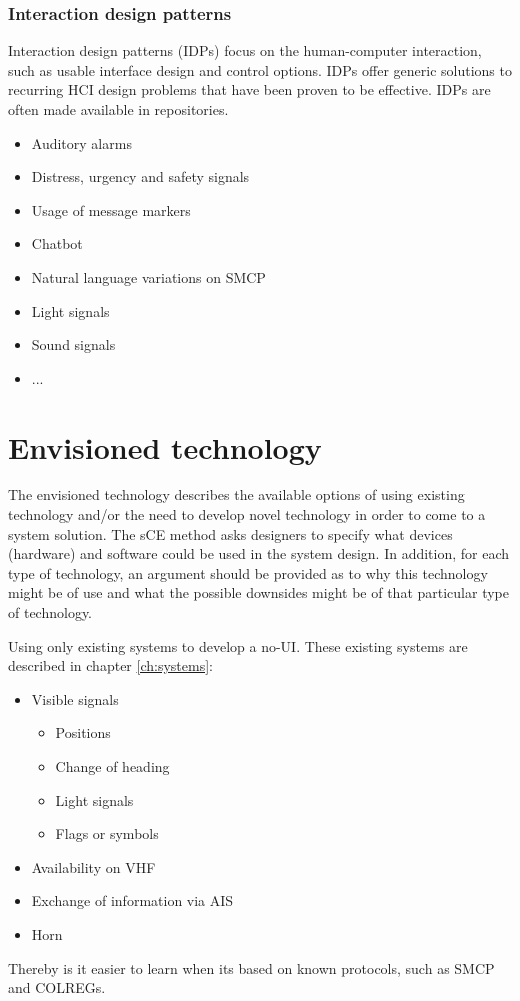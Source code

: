 \subsubsection{Interaction design patterns}
Interaction design patterns (IDPs) focus on the human-computer interaction, such as usable interface design and control options. IDPs offer generic solutions to recurring HCI design problems that have been proven to be effective. IDPs are often made available in repositories.

\begin{itemize}
	\item Auditory alarms
	\item Distress, urgency and safety signals
	\item Usage of message markers
	\item Chatbot
	\item Natural language variations on \ac{SMCP}
	\item Light signals
	\item Sound signals
	\item ...
\end{itemize}

\section{Envisioned technology}
The envisioned technology describes the available options of using existing technology and/or the need to develop novel technology in order to come to a system solution. The sCE method asks designers to specify what devices (hardware) and software could be used in the system design. In addition, for each type of technology, an argument should be provided as to why this technology might be of use and what the possible downsides might be of that particular type of technology.

Using only existing systems to develop a \acf{no-UI}. These existing systems are described in chapter \ref{ch:systems}:

\begin{itemize}
	\item Visible signals
	\begin{itemize}
		\item Positions
		\item Change of heading
		\item Light signals
		\item Flags or symbols
	\end{itemize}
	\item Availability on \ac{VHF}
	\item Exchange of information via \ac{AIS}
	\item Horn
\end{itemize}

Thereby is it easier to learn when its based on known protocols, such as \acf{SMCP} and \ac{COLREGs}.